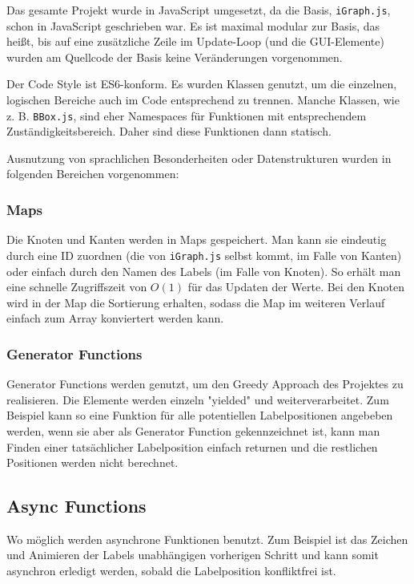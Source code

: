 %

Das gesamte Projekt wurde in JavaScript umgesetzt, da die Basis, \texttt{iGraph.js}, schon in JavaScript geschrieben war.
Es ist maximal modular zur Basis, das heißt, bis auf eine zusätzliche Zeile im Update-Loop (und die GUI-Elemente) wurden am Quellcode der Basis keine Veränderungen vorgenommen.

Der Code Style ist ES6-konform. Es wurden Klassen genutzt, um die einzelnen, logischen Bereiche auch im Code entsprechend zu trennen.
Manche Klassen, wie z. B. \texttt{BBox.js}, sind eher Namespaces für Funktionen mit entsprechendem Zuständigkeitsbereich. Daher sind diese Funktionen dann statisch.

Ausnutzung von sprachlichen Besonderheiten oder Datenstrukturen wurden in folgenden Bereichen vorgenommen:

\subsubsection{Maps}
Die Knoten und Kanten werden in Maps gespeichert. Man kann sie eindeutig durch eine ID zuordnen (die von \texttt{iGraph.js} selbst kommt, im Falle von Kanten) oder einfach durch den Namen des Labels (im Falle von Knoten).
So erhält man eine schnelle Zugriffszeit von $O(1)$ für das Updaten der Werte. Bei den Knoten wird in der Map die Sortierung erhalten, sodass die Map im weiteren Verlauf einfach zum Array konviertert werden kann.

\subsubsection{Generator Functions}
Generator Functions werden genutzt, um den Greedy Approach des Projektes zu realisieren.
Die Elemente werden einzeln "yielded" und weiterverarbeitet. Zum Beispiel kann so eine Funktion für alle potentiellen Labelpositionen angebeben werden,
wenn sie aber als Generator Function gekennzeichnet ist, kann man Finden einer tatsächlicher Labelposition einfach returnen und die restlichen Positionen werden nicht berechnet.

\subsection{Async Functions}
Wo möglich werden asynchrone Funktionen benutzt. Zum Beispiel ist das Zeichen und Animieren der Labels unabhängigen vorherigen Schritt und kann somit asynchron erledigt werden, sobald die Labelposition konfliktfrei ist.

